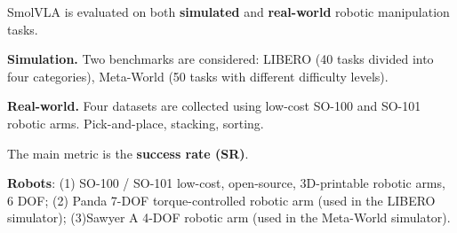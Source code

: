 \begin{dashlist}
    \item SmolVLA is evaluated on both \textbf{simulated} and \textbf{real-world} robotic manipulation tasks.
    \item \textbf{Simulation.} Two benchmarks are considered: LIBERO (40 tasks divided into four categories), Meta-World (50 tasks with different difficulty levels).
    \item \textbf{Real-world.} Four datasets are collected using low-cost SO-100 and SO-101 robotic arms. Pick-and-place, stacking, sorting.
    \item The main metric is the \textbf{success rate (SR)}.
    \item \textbf{Robots}:
        (1) SO-100 / SO-101 low-cost, open-source, 3D-printable robotic arms, 6 DOF;
        (2) Panda 7-DOF torque-controlled robotic arm (used in the LIBERO simulator);
        (3)Sawyer A 4-DOF robotic arm (used in the Meta-World simulator).


\end{dashlist}
